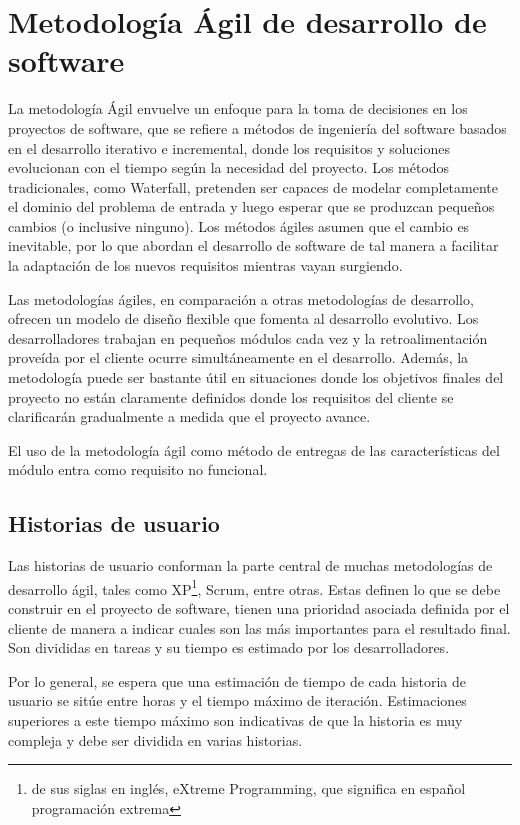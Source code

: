 \section{Metodología Ágil de desarrollo de software}
La metodología Ágil envuelve un enfoque para la toma de decisiones en los proyectos de software, que se refiere a métodos de ingeniería del software basados en el desarrollo iterativo e incremental, donde los requisitos y soluciones evolucionan con el tiempo según la necesidad del proyecto. Los métodos tradicionales, como Waterfall, pretenden ser capaces de modelar completamente el dominio del problema de entrada y luego esperar que se produzcan pequeños cambios (o inclusive ninguno)\citep{davis_agile_2015}. Los métodos ágiles asumen que el cambio es inevitable, por lo que abordan el desarrollo de software de tal manera a facilitar la adaptación de los nuevos requisitos mientras vayan surgiendo.

Las metodologías ágiles, en comparación a otras metodologías de desarrollo, ofrecen un modelo de diseño flexible que fomenta al desarrollo evolutivo. Los desarrolladores trabajan en pequeños módulos cada vez y la retroalimentación proveída por el cliente ocurre simultáneamente en el desarrollo. Además, la metodología puede ser bastante útil en situaciones donde los objetivos finales del proyecto no están claramente definidos donde los requisitos del cliente se clarificarán gradualmente a medida que el proyecto avance.

El uso de la metodología ágil como método de entregas de las características del módulo entra como requisito no funcional.

\subsection{Historias de usuario}
Las historias de usuario conforman la parte central de muchas metodologías de desarrollo ágil, tales como XP\footnote{de sus siglas en inglés, eXtreme Programming, que significa en español programación extrema}, Scrum, entre otras. Estas definen lo que se debe construir en el proyecto de software, tienen una prioridad asociada definida por el cliente de manera a indicar cuales son las más importantes para el resultado final. Son divididas en tareas y su tiempo es estimado por los desarrolladores.

Por lo general, se espera que una estimación de tiempo de cada historia de usuario se sitúe entre horas y el tiempo máximo de iteración. Estimaciones superiores a este tiempo máximo son indicativas de que la historia es muy compleja y debe ser dividida en varias historias.

